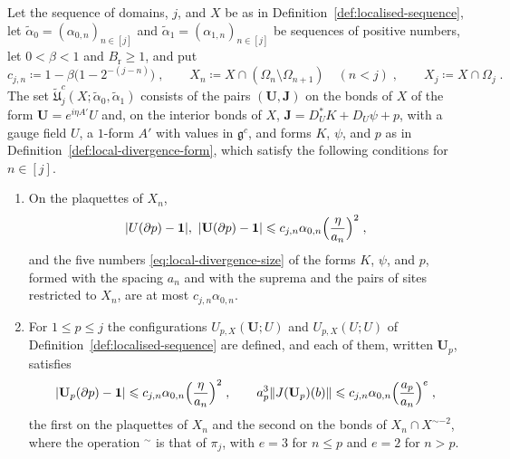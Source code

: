 \documentclass[11pt]{preprint}
\newcommand{\id}{\mathbf 1}
\DeclarePairedDelimiter{\abs}{\lvert}{\rvert}
\DeclarePairedDelimiter{\norm}{\lVert}{\rVert}
\numberwithin{equation}{section}
\begin{document}
\begin{definition}\label{def:pair-space-layers}
Let the sequence of domains, $j$, and $X$ be as in Definition~\ref{def:localised-sequence}, let $\tilde\alpha_0 = (\alpha_{0,n})_{n \in [j]}$ and $\tilde\alpha_1 = (\alpha_{1,n})_{n \in [j]}$ be sequences of positive numbers, let $0 < \beta < 1$ and $B_{\mathrm r} \geqslant 1$, and put
\begin{equation}\label{eq:layer-factor}
    c_{j,n} \coloneqq 1 - \beta\bigl(1 - 2^{-(j-n)}\bigr)\;,
    \qquad
    X_n \coloneqq X \cap (\Omega_n \setminus \Omega_{n+1}) \quad (n < j)\;,
    \qquad
    X_j \coloneqq X \cap \Omega_j\;.
\end{equation}
The set $\tilde{\mathfrak U}^c_j(X; \tilde\alpha_0, \tilde\alpha_1)$ consists of the pairs $(\mathbf U, \mathbf J)$ on the bonds of $X$ of the form $\mathbf U = e^{i\eta A'}U$ and, on the interior bonds of $X$, $\mathbf J = D^*_UK + D_U\psi + p$, with a gauge field $U$, a $1$-form $A'$ with values in $\mathfrak g^c$, and forms $K$, $\psi$, and $p$ as in Definition~\ref{def:local-divergence-form}, which satisfy the following conditions for $n \in [j]$.
\begin{enumerate}[label=(\roman*)]
\item On the plaquettes of $X_n$,
\begin{equation}\label{eq:pair-space-layers}
    \abs{U(\partial p) - \id},\ \abs{\mathbf U(\partial p) - \id} \leqslant c_{j,n}\alpha_{0,n}\Bigl(\frac{\eta}{a_n}\Bigr)^2\;,
\end{equation}
and the five numbers \eqref{eq:local-divergence-size} of the forms $K$, $\psi$, and $p$, formed with the spacing $a_n$ and with the suprema and the pairs of sites restricted to $X_n$, are at most $c_{j,n}\alpha_{0,n}$.
\item For $1 \leqslant p \leqslant j$ the configurations $U_{p,X}(\mathbf U; U)$ and $U_{p,X}(U; U)$ of Definition~\ref{def:localised-sequence} are defined, and each of them, written $\mathbf U_p$, satisfies
\begin{equation}\label{eq:pair-space-layers-derived}
    \abs{\mathbf U_p(\partial p) - \id} \leqslant c_{j,n}\alpha_{0,n}\Bigl(\frac{\eta}{a_n}\Bigr)^2\;,
    \qquad
    a_p^3\norm{J(\mathbf U_p)(b)} \leqslant c_{j,n}\alpha_{0,n}\Bigl(\frac{a_p}{a_n}\Bigr)^{e}\;,
\end{equation}
the first on the plaquettes of $X_n$ and the second on the bonds of $X_n \cap X^{\sim-2}$, where the operation ${}^\sim$ is that of $\pi_j$, with $e = 3$ for $n \leqslant p$ and $e = 2$ for $n > p$.

\end{enumerate}
\end{definition}
\end{document}
